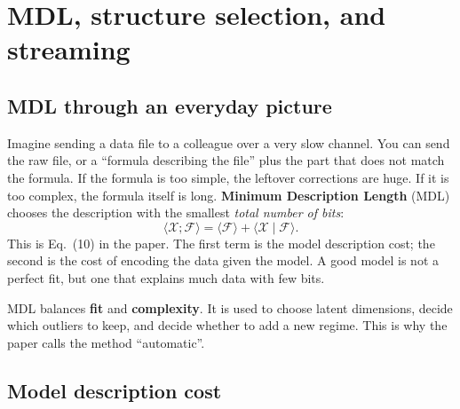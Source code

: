 \section{MDL, structure selection, and streaming}
\label{sec:mdl-streaming}

\subsection{MDL through an everyday picture}

Imagine sending a data file to a colleague over a very slow channel. You can send the raw file, or a
``formula describing the file'' plus the part that does not match the formula. If the formula is too
simple, the leftover corrections are huge. If it is too complex, the formula itself is long.
\textbf{Minimum Description Length} (MDL) chooses the description with the smallest \emph{total
number of bits}:
\begin{equation}
  \bigl\langle \mathcal{X};\mathcal{F}\bigr\rangle
  =\bigl\langle \mathcal{F}\bigr\rangle
   +\bigl\langle \mathcal{X}\mid\mathcal{F}\bigr\rangle.
  \label{eq:mdl-total}
\end{equation}
This is Eq.~(10) in the paper. The first term is the model description cost; the second is the cost of
encoding the data given the model. A good model is not a perfect fit, but one that explains much data
with few bits.

\begin{keypoint}
MDL balances \textbf{fit} and \textbf{complexity}. It is used to choose latent dimensions, decide
which outliers to keep, and decide whether to add a new regime. This is why the paper calls the method
``automatic''.
\end{keypoint}

\subsection{Model description cost}

